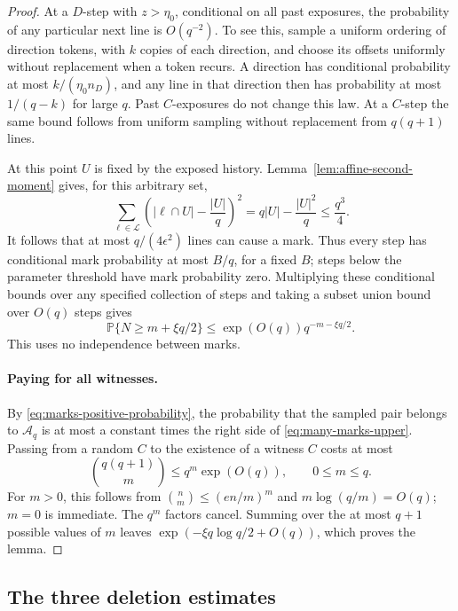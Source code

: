 \begin{proof}
At a $D$-step with $z>\eta_0$, conditional on all past exposures, the
probability of any particular next line is $O(q^{-2})$.  To see this,
sample a uniform ordering of direction tokens, with $k$ copies of each
direction, and choose its offsets uniformly without replacement when a
token recurs.  A direction has conditional probability at most
$k/(\eta_0n_D)$, and any line in that direction then has probability at
most $1/(q-k)$ for large $q$.  Past $C$-exposures do not change this law.
At a $C$-step the same bound follows from uniform sampling without
replacement from $q(q+1)$ lines.

At this point $U$ is fixed by the exposed history.
Lemma~\ref{lem:affine-second-moment} gives, for this arbitrary set,
\begin{equation}\label{eq:affine-variance}
 \sum_{\ell\in\mathcal L}
       \left(|\ell\cap U|-\frac{|U|}{q}\right)^2
       =q|U|-\frac{|U|^2}{q}\le\frac{q^3}{4}.
\end{equation}
It follows that at most $q/(4\epsilon^2)$ lines can cause a mark.  Thus every step has
conditional mark probability at most $B/q$, for a fixed $B$; steps below
the parameter threshold have mark probability zero.  Multiplying these
conditional bounds over any specified collection of steps and taking a
subset union bound over $O(q)$ steps gives
\begin{equation}\label{eq:many-marks-upper}
 \mathbb P\{N\ge m+\xi q/2\}
 \le \exp(O(q))q^{-m-\xi q/2}.
\end{equation}
This uses no independence between marks.

\paragraph{Paying for all witnesses.}
By \eqref{eq:marks-positive-probability}, the probability that the sampled
pair belongs to $\mathscr A_q$ is at most a constant times the right side
of \eqref{eq:many-marks-upper}.  Passing from a random $C$ to the existence
of a witness $C$ costs at most
\[
 \binom{q(q+1)}m\le q^m\exp(O(q)),\qquad 0\le m\le q.
\]
For $m>0$, this follows from $\binom nm\le(en/m)^m$ and
$m\log(q/m)=O(q)$; $m=0$ is immediate.  The $q^m$ factors cancel.
Summing over the at most $q+1$ possible values of $m$ leaves
$\exp(-\xi q\log q/2+O(q))$, which proves the lemma.
\end{proof}

\subsection{The three deletion estimates}

